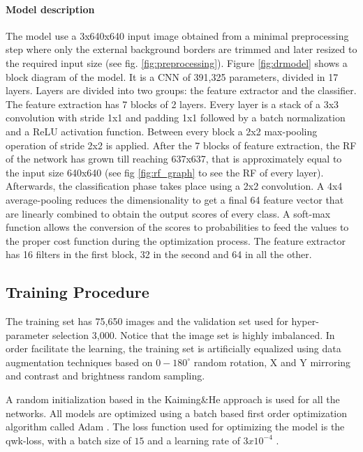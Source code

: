 \documentclass[preprint]{elsarticle}
\theoremstyle{definition} %
\theoremstyle{remark}
\begin{document}
\paragraph{Model description} The model use a 3x640x640 input image obtained from a minimal preprocessing step where only the external background borders are trimmed and later resized to the required input size (see fig. \ref{fig:preprocessing}). Figure \ref{fig:drmodel} shows a block diagram of the model. It is a CNN of 391,325 parameters, divided in 17 layers. Layers are divided into two groups: the feature extractor and the classifier. The feature extraction has 7 blocks of 2 layers. Every layer is a stack of a 3x3 convolution with stride 1x1 and padding 1x1 followed by a batch normalization and a ReLU activation function. Between every block a 2x2 max-pooling operation of stride 2x2 is applied. After the 7 blocks of feature extraction, the RF of the network has grown till reaching 637x637, that is approximately equal to the input size 640x640 (see fig \ref{fig:rf_graph} to see the RF of every layer). Afterwards, the classification phase takes place using a 2x2 convolution. A 4x4 average-pooling reduces the dimensionality to get a final 64 feature vector that are linearly combined to obtain the output scores of every class. A soft-max function allows the conversion of the scores to probabilities to feed the values to the proper cost function during the optimization process. The feature extractor has 16 filters in the first block, 32 in the second and 64 in all the other.

\subsection{Training Procedure}

The training set has 75,650 images and the validation set used for hyper-parameter selection 3,000. Notice that the image set is highly imbalanced. In order facilitate the learning, the training set is artificially equalized using data augmentation techniques \citep{Krizhevsky:2012} based on $0-180^{\circ}$ random rotation, X and Y mirroring and contrast and brightness random sampling.

A random initialization based in the Kaiming\&He approach \citep{kaiming} is used for all the networks. All models are optimized using a batch based first order optimization algorithm called Adam \citep{DBLP:journals/corr/KingmaB14}. The loss function used for optimizing the model is the qwk-loss, with a batch size of $15$ and a learning rate of $3x10^{-4}$ \citep{DELATORRE2017}. 
\end{document}
